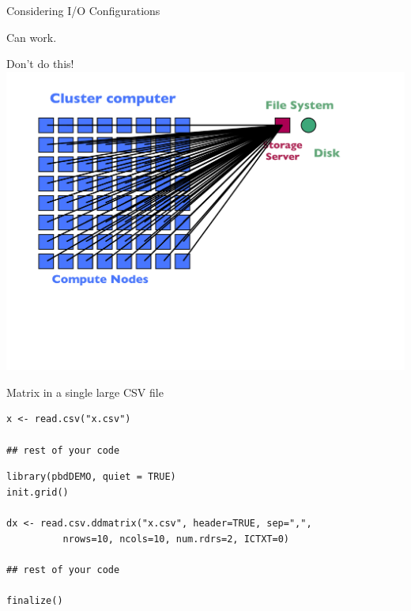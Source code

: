 \begin{frame}{Considering I/O Configurations}
\begin{minipage}{0.32\textwidth}
\begin{block}{Can work.}
    \end{block}
  \end{minipage}\hspace{1ex}
  \begin{minipage}{0.32\textwidth}
    \begin{block}{Don't do this!}
      \includegraphics[trim=0 120 30 40,clip,width=1\textwidth]{../common/pics/hardware/ParallelHardware16.pdf}
    \end{block}
  \end{minipage}
\end{frame}

\begin{frame}[fragile]
  \begin{exampleblock}{Matrix in a single large CSV file}\pause
\begin{lstlisting}[title=Serial Code]
x <- read.csv("x.csv")

## rest of your code
\end{lstlisting}

\begin{lstlisting}[title=Partially Parallel Code]
library(pbdDEMO, quiet = TRUE)
init.grid()

dx <- read.csv.ddmatrix("x.csv", header=TRUE, sep=",", 
          nrows=10, ncols=10, num.rdrs=2, ICTXT=0)

## rest of your code

finalize()
\end{lstlisting}
  \end{exampleblock}
\end{frame}

